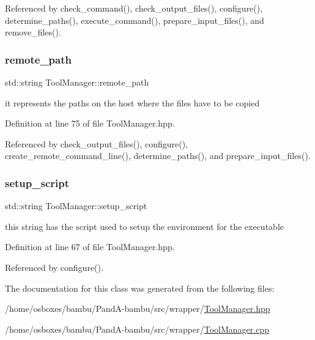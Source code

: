 Referenced by check\+\_\+command(), check\+\_\+output\+\_\+files(), configure(), determine\+\_\+paths(), execute\+\_\+command(), prepare\+\_\+input\+\_\+files(), and remove\+\_\+files().

\mbox{\label{classToolManager_a01d51d439d7326cd32b06fe3c43f04ae}} 
\subsubsection{\texorpdfstring{remote\+\_\+path}{remote\_path}}
{\footnotesize\ttfamily std\+::string Tool\+Manager\+::remote\+\_\+path\hspace{0.3cm}{\ttfamily [protected]}}



it represents the paths on the host where the files have to be copied 



Definition at line 75 of file Tool\+Manager.\+hpp.



Referenced by check\+\_\+output\+\_\+files(), configure(), create\+\_\+remote\+\_\+command\+\_\+line(), determine\+\_\+paths(), and prepare\+\_\+input\+\_\+files().

\mbox{\label{classToolManager_a21618f33c4d9a4da9ab3962c9a3af0bb}} 
\subsubsection{\texorpdfstring{setup\+\_\+script}{setup\_script}}
{\footnotesize\ttfamily std\+::string Tool\+Manager\+::setup\+\_\+script\hspace{0.3cm}{\ttfamily [protected]}}



this string has the script used to setup the environment for the executable 



Definition at line 67 of file Tool\+Manager.\+hpp.



Referenced by configure().



The documentation for this class was generated from the following files\+:\begin{DoxyCompactItemize}
\item 
/home/osboxes/bambu/\+Pand\+A-\/bambu/src/wrapper/\hyperlink{ToolManager_8hpp}{Tool\+Manager.\+hpp}\item 
/home/osboxes/bambu/\+Pand\+A-\/bambu/src/wrapper/\hyperlink{ToolManager_8cpp}{Tool\+Manager.\+cpp}\end{DoxyCompactItemize}
